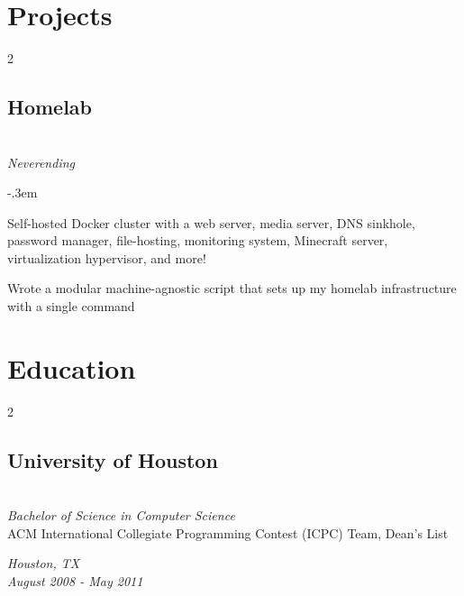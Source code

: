 \documentclass{article}
\let\olditemize=\itemize \let\endolditemize=\enditemize
\renewenvironment{itemize}{\olditemize[topsep=0em] \itemsep-.3em}{\endolditemize}
\newenvironment{twocolentry}[2][]{
    \def\secondColumn{#2}
    \raggedright
    \setcolumnwidth{\fill, 6cm}
    \begin{paracol}{2}
}{
    \switchcolumn \raggedleft \secondColumn
    \end{paracol}
} %
\begin{document}
\section{Projects}

\begin{twocolentry}{
  \textit{Neverending}
}
\subsection{Homelab}\hfill\\
\end{twocolentry}

\begin{itemize}
  \item Self-hosted Docker cluster with a web server, media server, DNS
    sinkhole, password manager, file-hosting, monitoring system, Minecraft
    server, virtualization hypervisor, and more!
  \item Wrote a modular machine-agnostic script that sets up my homelab
    infrastructure with a single command
\end{itemize}

\section{Education}
\begin{twocolentry}{
  \textit{Houston, TX} \\
  \textit{August 2008 - May 2011} \\
}
\subsection{University of Houston}\hfill\\
\textit{Bachelor of Science in Computer Science}\\
ACM International Collegiate Programming Contest (ICPC) Team, Dean's List
\end{twocolentry}
\end{document}
